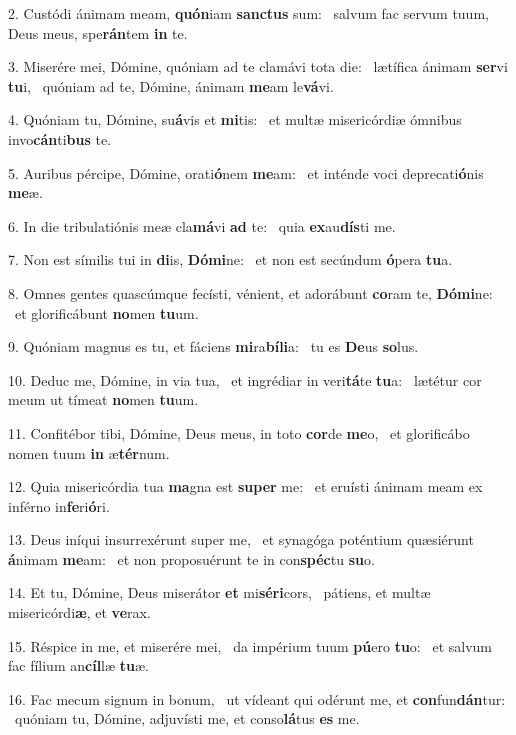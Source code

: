 2. Custódi ánimam meam, \textbf{quón}iam \textbf{sanc}\textbf{tus} sum: \ast\  salvum fac servum tuum, Deus meus, spe\textbf{rán}tem \textbf{in} te.\

3. Miserére mei, Dómine, quóniam ad te clamávi tota die: \dag\  lætífica ánimam \textbf{ser}vi \textbf{tu}i, \ast\  quóniam ad te, Dómine, ánimam \textbf{me}am le\textbf{vá}vi.\

4. Quóniam tu, Dómine, su\textbf{á}vis et \textbf{mi}tis: \ast\  et multæ misericórdiæ ómnibus invo\textbf{cán}ti\textbf{bus} te.\

5. Auribus pércipe, Dómine, orati\textbf{ó}nem \textbf{me}am: \ast\  et inténde voci deprecati\textbf{ó}nis \textbf{me}æ.\

6. In die tribulatiónis meæ cla\textbf{má}vi \textbf{ad} te: \ast\  quia \textbf{ex}au\textbf{dís}ti me.\

7. Non est símilis tui in \textbf{di}is, \textbf{Dó}\textbf{mi}ne: \ast\  et non est secúndum \textbf{ó}pera \textbf{tu}a.\

8. Omnes gentes quascúmque fecísti, vénient, et adorábunt \textbf{co}ram te, \textbf{Dó}\textbf{mi}ne: \ast\  et glorificábunt \textbf{no}men \textbf{tu}um.\

9. Quóniam magnus es tu, et fáciens \textbf{mi}ra\textbf{bí}\textbf{li}a: \ast\  tu es \textbf{De}us \textbf{so}lus.\

10. Deduc me, Dómine, in via tua, \dag\  et ingrédiar in veri\textbf{tá}te \textbf{tu}a: \ast\  lætétur cor meum ut tímeat \textbf{no}men \textbf{tu}um.\

11. Confitébor tibi, Dómine, Deus meus, in toto \textbf{cor}de \textbf{me}o, \ast\  et glorificábo nomen tuum \textbf{in} æ\textbf{tér}num.\

12. Quia misericórdia tua \textbf{ma}gna est \textbf{su}\textbf{per} me: \ast\  et eruísti ánimam meam ex inférno in\textbf{fe}ri\textbf{ó}ri.\

13. Deus iníqui insurrexérunt super me, \dag\  et synagóga poténtium quæsiérunt \textbf{á}nimam \textbf{me}am: \ast\  et non proposuérunt te in con\textbf{spéc}tu \textbf{su}o.\

14. Et tu, Dómine, Deus miserátor \textbf{et} mi\textbf{sé}\textbf{ri}cors, \ast\  pátiens, et multæ misericórdi\textbf{æ}, et \textbf{ve}rax.\

15. Réspice in me, et miserére mei, \dag\  da impérium tuum \textbf{pú}ero \textbf{tu}o: \ast\  et salvum fac fílium an\textbf{cíl}læ \textbf{tu}æ.\

16. Fac mecum signum in bonum, \dag\  ut vídeant qui odérunt me, et \textbf{con}fun\textbf{dán}tur: \ast\  quóniam tu, Dómine, adjuvísti me, et conso\textbf{lá}tus \textbf{es} me.\

